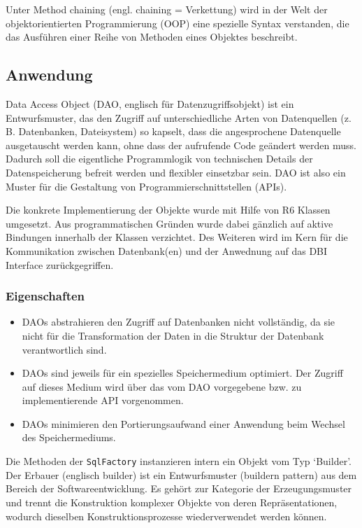 \documentclass[]{article}
\providecommand{\tightlist}{%
  \setlength{\itemsep}{0pt}\setlength{\parskip}{0pt}}
\begin{document}
Unter Method chaining (engl. chaining = Verkettung) wird in der Welt der
objektorientierten Programmierung (OOP) eine spezielle Syntax
verstanden, die das Ausführen einer Reihe von Methoden eines Objektes
beschreibt.

\hypertarget{anwendung}{%
\subsection{Anwendung}\label{anwendung}}

Data Access Object (DAO, englisch für Datenzugriffsobjekt) ist ein
Entwurfsmuster, das den Zugriff auf unterschiedliche Arten von
Datenquellen (z. B. Datenbanken, Dateisystem) so kapselt, dass die
angesprochene Datenquelle ausgetauscht werden kann, ohne dass der
aufrufende Code geändert werden muss. Dadurch soll die eigentliche
Programmlogik von technischen Details der Datenspeicherung befreit
werden und flexibler einsetzbar sein. DAO ist also ein Muster für die
Gestaltung von Programmierschnittstellen (APIs).

Die konkrete Implementierung der Objekte wurde mit Hilfe von R6 Klassen
umgesetzt. Aus programmatischen Gründen wurde dabei gänzlich auf aktive
Bindungen innerhalb der Klassen verzichtet. Des Weiteren wird im Kern
für die Kommunikation zwischen Datenbank(en) und der Anwednung auf das
DBI Interface zurückgegriffen.

\hypertarget{eigenschaften}{%
\subsubsection{Eigenschaften}\label{eigenschaften}}

\begin{itemize}
\tightlist
\item
  DAOs abstrahieren den Zugriff auf Datenbanken nicht vollständig, da
  sie nicht für die Transformation der Daten in die Struktur der
  Datenbank verantwortlich sind.
\item
  DAOs sind jeweils für ein spezielles Speichermedium optimiert. Der
  Zugriff auf dieses Medium wird über das vom DAO vorgegebene bzw. zu
  implementierende API vorgenommen.
\item
  DAOs minimieren den Portierungsaufwand einer Anwendung beim Wechsel
  des Speichermediums.
\end{itemize}

Die Methoden der \texttt{SqlFactory} instanzieren intern ein Objekt vom
Typ `Builder'. Der Erbauer (englisch builder) ist ein Entwurfsmuster
(buildern pattern) aus dem Bereich der Softwareentwicklung. Es gehört
zur Kategorie der Erzeugungsmuster und trennt die Konstruktion komplexer
Objekte von deren Repräsentationen, wodurch dieselben
Konstruktionsprozesse wiederverwendet werden können.
\end{document}
